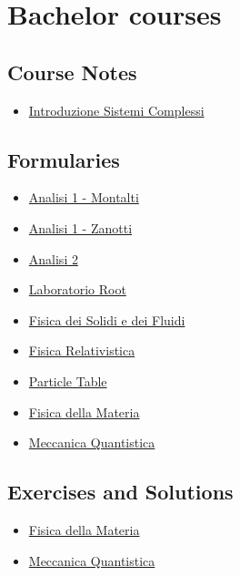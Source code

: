 \documentclass{article}
\begin{document}
\section{Bachelor courses}

\subsection{Course Notes}

    \begin{itemize}
        \item \href{source/b_introduzione_sistemi_complessi.html}{Introduzione Sistemi Complessi}
    \end{itemize}

\subsection{Formularies}

    \begin{itemize}
        \item \href{source/b_formulario_analisi_1_mon.html}{Analisi 1 - Montalti}
        \item \href{source/b_formulario_analisi_1_zan.html}{Analisi 1 - Zanotti}
        \item \href{source/b_formulario_analisi_2.html}{Analisi 2}
        \item \href{source/b_formulario_laboratorio_root.html}{Laboratorio Root}
        \item \href{source/b_formulario_fisica_dei_solidi_e_dei_fluidi.html}{Fisica dei Solidi e dei Fluidi}
        \item \href{source/b_formulario_fisica_relativistica.html}{Fisica Relativistica}
        \item \href{source/b_formulario_particle_table.html}{Particle Table}
        \item \href{source/b_formulario_materia.html}{Fisica della Materia}
        \item \href{source/b_formulario_meccanica_quantistica.html}{Meccanica Quantistica}
    \end{itemize}

\subsection{Exercises and Solutions}

    \begin{itemize}
        \item \href{source/b_exercises_soluzioni_materia.html}{Fisica della Materia}
        \item \href{source/b_exercises_soluzioni_meccanica_quantistica.html}{Meccanica Quantistica}
    \end{itemize}
\end{document}
